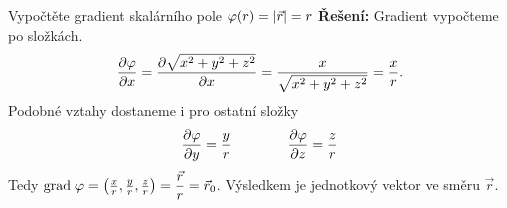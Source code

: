 \begin{mdframed}[style=mdexam]
\begin{example}\label{fyz:fey_exam013}
    Vypočtěte gradient skalárního pole \(\varphi(r) = \left\lvert\vec{r}\right\rvert = r\)\newline  
  \textbf{Řešení:} Gradient vypočteme po složkách.
  \begin{equation*}
    \dfrac{\partial \varphi}{\partial x} = \dfrac{\partial \sqrt{x^2+y^2+z^2}}{\partial x} = \dfrac{x}{\sqrt{x^2+y^2+z^2}} = \dfrac{x}{r}.
  \end{equation*}
  Podobné vztahy dostaneme i pro ostatní složky
  \begin{equation*}
    \dfrac{\partial \varphi}{\partial y} = \dfrac{y}{r} \qquad\qquad \dfrac{\partial \varphi}{\partial z} = \dfrac{z}{r}
  \end{equation*}
  Tedy \(\mathrm{grad\;}\varphi = \left(\frac{x}{r}, \frac{y}{r}, \frac{z}{r}\right) =
  \dfrac{\vec{r}}{r} = \vec{r}_0\). Výsledkem je jednotkový vektor ve směru \(\vec{r}\).

\end{example}
\end{mdframed}